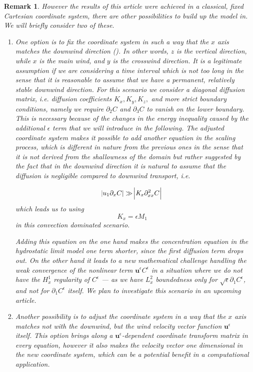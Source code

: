 \documentclass[11pt]{article}
\newtheorem{remark}{Remark}
\begin{document}
\begin{remark}
\normalfont However the results of this article were achieved in a classical, fixed Cartesian coordinate system, there are other possibilities to build up the model in. We will briefly consider two of these.

  \begin{enumerate}
  
    \item One option is to fix the coordinate system in such a way that the $x$ axis matches the downwind direction (\cite{goyal2011mathematical}). In other words, $z$ is the vertical direction, while $x$ is the main wind, and $y$ is the crosswind direction. It is a legitimate assumption if we are considering a time interval which is not too long in the sense that it is reasonable to assume that we have a permanent, relatively stable downwind direction. For this scenario we consider a diagonal diffusion matrix, i.e. diffusion coefficients $K_x, K_y, K_z,$ and more strict boundary conditions, namely we require $\partial_2 C$ and $\partial_3 C$ to vanish on the lower boundary. This is necessary because of the changes in the energy inequality caused by the additional $\epsilon$ term that we will introduce in the following. The adjusted coordinate system makes it possible to add another equation in the scaling process, which is different in nature from the previous ones in the sense that it is not derived from the shallowness of the domain but rather suggested by the fact that in the downwind direction it is natural to assume that the diffusion is negligible compared to downwind transport, i.e.
    
    \begin{equation} \abs{u_1 \partial_x C} \gg \abs{ \textit{K}_{x} \partial_{xx} ^2 C }\end{equation}
    which leads us to using
    \[ K_x = \epsilon M_1 \]
    in this convection dominated scenario.
    
    Adding this equation on the one hand makes the concentration equation in the hydrostatic limit model one term shorter, since the first diffusion term drops out. On the other hand it leads to a new mathematical challenge handling the weak convergence of the nonlinear term $\mathbf{u}^\epsilon C^\epsilon$ in a situation where we do not have the $H^1_x$ regularity of $C^\epsilon$ --- as we have $L^2_x$ boundedness only for $\sqrt{\epsilon} \partial_1 C^\epsilon$, and not for $\partial_1 C^\epsilon$ itself. We plan to investigate this scenario in an upcoming article.
    
    \item Another possibility is to adjust the coordinate system in a way that the $x$ axis matches not with the downwind, but the wind velocity vector function $\mathbf{u}^\epsilon$ itself. This option brings along a $\mathbf{u}^\epsilon$-dependent coordinate transform matrix in every equation, however it also makes the velocity vector one dimensional in the new coordinate system, which can be a potential benefit in a computational application.

  \end{enumerate}
  
\end{remark}
\end{document}
